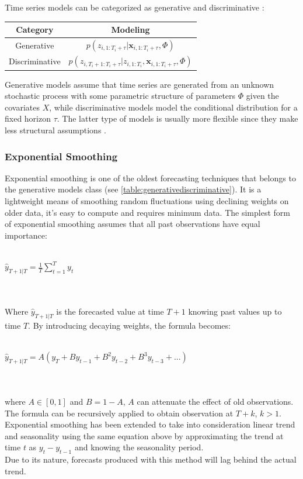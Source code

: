 \documentclass[a4paper]{article} %
\begin{document}
	Time series models can be categorized as generative and discriminative \cite{DiscriminativeGenerativeModels}:\\
	\begin{center} \label{table:generativediscriminative}
		\begin{tabular}{ | c | c |}
			\hline
			Category & Modeling \\
			\hline
			Generative & $p(z_{i,1:T_i+\tau} | \pmb{x}_{i, 1:T_i + \tau}, \Phi)$ \\
			\hline
			Discriminative & $p(z_{i,T_{i}+1:T_i+\tau} | z_{i, 1:T_i}, \pmb{x}_{i, 1:T_i + \tau}, \Phi)$ \\
			\hline
		\end{tabular}
	\end{center}
	Generative models assume that time series are generated from an unknown stochastic process with some parametric structure of parameters $\Phi$ given the covariates $X$, while discriminative models model the conditional distribution for a fixed horizon $\tau$. The latter type of models is usually more flexible since they make less structural assumptions \cite{GluonTS}.
	
	
	\subsubsection{Exponential Smoothing} \label{sssec:exponential_smoothing}
	Exponential smoothing \cite{ExponentialSmoothingHoltCharles} is one of the oldest forecasting techniques that belongs to the generative models class (see \ref{table:generativediscriminative}). It is a lightweight means of smoothing random fluctuations using declining weights on older data, it's easy to compute and requires minimum data.
	The simplest form of exponential smoothing assumes that all past observations have equal importance:\\\\
	\centerline{$\hat{y}_{T+1|T} = \frac{1}{T} \sum_{t=1}^{T}y_t$}\\\\
	Where $\hat{y}_{T+1|T}$ is the forecasted value at time $T+1$ knowing past values up to time $T$. By introducing decaying weights, the formula becomes:\\\\
		\centerline{$\hat{y}_{T+1|T} = A(y_T + B y_{t-1} + B^2 y_{t-2} + B^3 y_{t-3} + ...)$ }\\\\
	where $A \in [0,1]$ and $B=1-A$, $A$ can attenuate the effect of old observations. The formula can be recursively applied to obtain observation at $T+k$, $k>1$. \\
	Exponential smoothing has been extended to take into consideration linear trend and seasonality \cite{ExponentialSmoothingHoltCharles} using the same equation above by approximating the trend at time $t$ as $y_t -y_{t-1}$ and knowing the seasonality period.\\
	Due to its nature, forecasts produced with this method will lag behind the actual trend.
	
\end{document}
